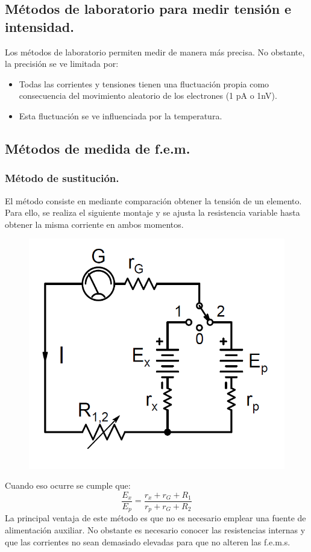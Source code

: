 \subsection{Métodos de laboratorio para medir tensión e intensidad.}
Los métodos de laboratorio permiten medir de manera más precisa. No obstante, la precisión se ve limitada por:
\begin{itemize}
	\item Todas las corrientes y tensiones tienen una fluctuación propia como consecuencia del movimiento aleatorio de los electrones (1 pA o 1nV).
	\item Esta fluctuación se ve influenciada por la temperatura.
\end{itemize}
\subsection{Métodos de medida de f.e.m.}
\subsubsection{Método de sustitución.}
El método consiste en mediante comparación obtener la tensión de un elemento. Para ello, se realiza el siguiente montaje y se ajusta la resistencia variable hasta obtener la misma corriente en ambos momentos.
\begin{figure}[H]
	\centering
	\includegraphics[width=0.5\linewidth]{ImagenesTema4/7}
	\label{fig:7}
\end{figure}
Cuando eso ocurre se cumple que:
\[\frac{E_x}{E_p}=\frac{r_x+r_G+R_1}{r_p+r_G+R_2}\]
La principal ventaja de este método es que no es necesario emplear una fuente de alimentación auxiliar. No obstante es necesario conocer las resistencias internas y que las corrientes no sean demasiado elevadas para que no alteren las f.e.m.s.

